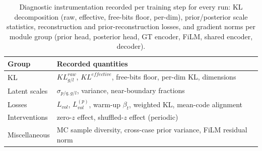 \begin{table}[t]
\centering
\caption{Diagnostic instrumentation recorded per training step for
every run: KL decomposition (raw, effective, free-bits floor, per-dim),
prior/posterior scale statistics, reconstruction and prior-reconstruction
losses, and gradient norms per module group (prior head, posterior head,
GT encoder, FiLM, shared encoder, decoder).}
\label{tab:instrumentation}
\begin{tabular}{@{}ll@{}}
\toprule
Group & Recorded quantities \\
\midrule
KL & $KL_{g/l}^{raw}$, $KL^{effective}$, free-bits floor, per-dim KL, dimensions \\
Latent scales & $\sigma_{p/q,g/l}$, variance, near-boundary fractions \\
Losses & $L_{vol}$, $L_{vol}^{(p)}$, warm-up $\beta_t$, weighted KL, mean-code alignment \\
Interventions & zero-$z$ effect, shuffled-$z$ effect (periodic) \\
Miscellaneous & MC sample diversity, cross-case prior variance, FiLM residual norm \\
\bottomrule
\end{tabular}
\end{table}